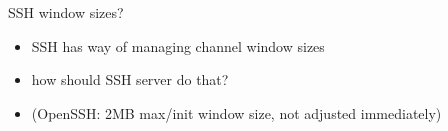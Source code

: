 
\begin{frame}{SSH window sizes?}
    \begin{itemize}
    \item SSH has way of managing channel window sizes
    \item how should SSH server do that?
    \vspace{.5cm}
    \item (OpenSSH: 2MB max/init window size, not adjusted immediately)
    \end{itemize}
\end{frame}
